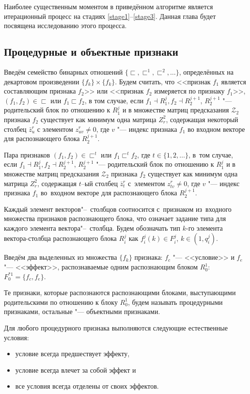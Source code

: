 Наиболее существенным моментом в приведённом алгоритме является итерационный процесс на стадиях \ref{stage1}--\ref{stage3}. Данная глава будет посвящена исследованию этого процесса.

\subsection{Процедурные и объектные признаки}

Введём семейство бинарных отношений $\{\sqsubset,\sqsubset^1,\sqsubset^2,\dots\}$, определённых на декартовом произведении $\{f_k\}\times \{f_k\}$. Будем считать, что <<признак $f_1$ является составляющим признака $f_2$>> или <<признак $f_2$ измеряется по признаку $f_1$>>, $(f_1,f_2 )\in\sqsubset$ или $f_1\sqsubset f_2$, в том случае, если $f_1\dashv R_1^j, f_2\dashv R_2^{j+1}$, $R_2^{j+1}$ "--- родительский блок по отношению к $R_1^j$ и в множестве матриц предсказания $\mathcal Z_2$ признака $f_2$ существует как минимум одна матрица $Z_r^2$, содержащая некоторый столбец $\bar z_u^r$ с элементом $z_{uv}^r\not=0$, где $v$ "--- индекс признака $f_1$ во входном векторе для распознающего блока $R_2^{j+1}$.

Пара признаков $(f_1,f_2)\in\sqsubset^t$ или $f_1\sqsubset^t f_2$, где $t\in\{1,2,\dots\}$, в~том случае, если $f_1\dashv R_1^j, f_2\dashv R_2^{j+1}$, $R_2^{j+1}$ "--- родительский блок по отношению к $R_1^j$ и в множестве матриц предсказания $\mathcal Z_2$ признака $f_2$ существует как минимум одна матрица $Z_r^2$, содержащая $t$–ый столбец $\bar z_t^r$ с~элементом $z_{tv}^r\not=0$, где $v$ "--- индекс признака $f_1$ во~входном векторе для распознающего блока $R_2^{j+1}$.

Каждый элемент векторов"--~столбцов соотносится с~признаком из~входного множества признаков распознающего блока, что означает задание типа для каждого элемента вектора"--~столбца. Будем обозначать тип $k$-го элемента вектора-столбца распознающего блока $R_i^j$ как $f_i^j(k)\in F_i^j$, $k\in(1,q_i^j)$. 

Введём два выделенных из множества $\{f_k\}$ признака: $f_c$ "--- <<условие>> и $f_e$ "--- <<эффект>>, распознаваемые одним распознающим блоком $R_0^1$: $F_0^{*1}=\{f_c,f_e\}$.
\begin{Def}
	Те признаки, которые распознаются распознающими блоками, выступающими родительскими по отношению к блоку $R_0^1$, будем называть процедурными признаками, остальные "--- объектными признаками.
\end{Def}
Для любого процедурного признака выполняются следующие естественные условия:
\begin{itemize}
	\item условие всегда предшествует эффекту,
	\item условие всегда влечет за собой эффект и
	\item все условия всегда отделены от своих эффектов.
\end{itemize}

